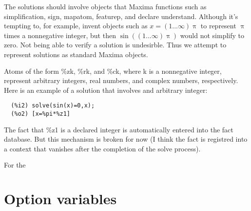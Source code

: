 \documentclass[]{article}%
\begin{document}
The solutions should involve objects that Maxima functions such as simplification, sign, mapatom, featurep,
and declare understand. Although it's tempting to, for example, invent objects such as
\(x = (1 ... \infty) \uppi\) to represent \(\uppi\) times a nonnegative integer, but then
\(\sin \left ((1 ... \infty) \uppi \right) \) would not simplify to zero. Not being able to verify a
solution is undesirble. Thus we attempt to represent solutions as standard Maxima objects.

Atoms of the form \%zk, \%rk, and \%ck, where k is a nonnegative integer, represent arbitrary integers, real numbers, and complex numbers, respectively. Here is an example of a solution that involves and arbitrary integer:
\begin{verbatim}
  (%i2)	solve(sin(x)=0,x);
  (%o2)	[x=%pi*%z1]
\end{verbatim}
The fact that \%z1 is a declared integer is automatically entered into the fact database. But this mechanism is broken for now (I think the fact is registred into a context that vanishes after the completion of the solve process).

For the


\section{Option variables}
\end{document}
